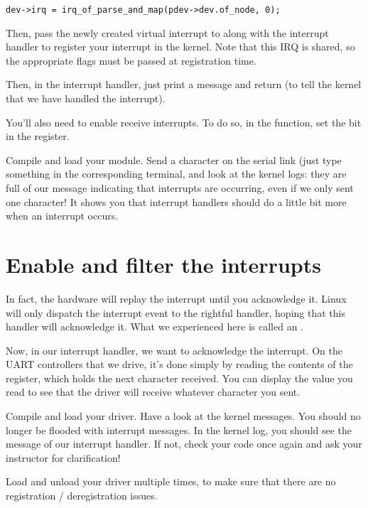 \begin{verbatim}
dev->irq = irq_of_parse_and_map(pdev->dev.of_node, 0);
\end{verbatim}

Then, pass the newly created virtual interrupt to 
along with the interrupt handler to register your interrupt in the
kernel. Note that this IRQ is shared, so the appropriate flags must be
passed at registration time.

Then, in the interrupt handler, just print a message and return
 (to tell the kernel that we have handled the
interrupt).

You'll also need to enable receive interrupts.
To do so, in the  function, set the
 bit in the  register.

Compile and load your module. Send a character on the serial link (just
type something in the corresponding  terminal, and
look at the kernel logs: they are full of our message indicating that
interrupts are occurring, even if we only sent one character! It shows
you that interrupt handlers should do a little bit more when an
interrupt occurs.

\section{Enable and filter the interrupts}

In fact, the hardware will replay the interrupt until you acknowledge
it. Linux will only dispatch the interrupt event to the rightful
handler, hoping that this handler will acknowledge it. What we
experienced here is called an .

Now, in our interrupt handler, we want to acknowledge the
interrupt. On the UART controllers that we drive, it's done simply by
reading the contents of the  register, which holds the
next character received. You can display the value you read to see
that the driver will receive whatever character you sent.

Compile and load your driver. Have a look at the kernel messages. You
should no longer be flooded with interrupt messages. In the kernel
log, you should see the message of our interrupt handler. If not,
check your code once again and ask your instructor for clarification!

Load and unload your driver multiple times, to make sure that 
there are no registration / deregistration issues.

